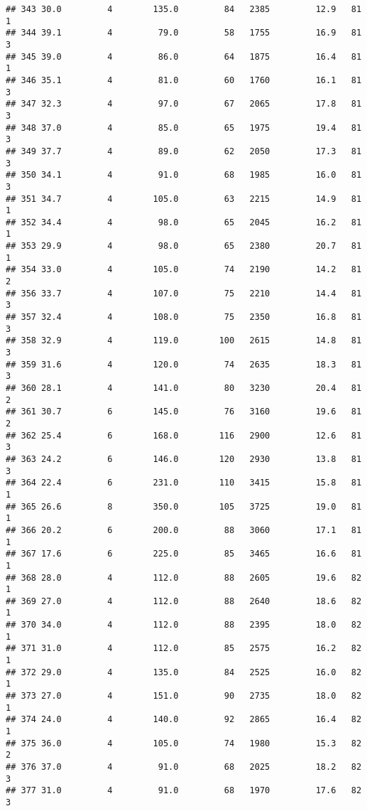 \documentclass[
]{article}
\begin{document}
\begin{verbatim}
## 343 30.0         4        135.0         84   2385         12.9   81      1
## 344 39.1         4         79.0         58   1755         16.9   81      3
## 345 39.0         4         86.0         64   1875         16.4   81      1
## 346 35.1         4         81.0         60   1760         16.1   81      3
## 347 32.3         4         97.0         67   2065         17.8   81      3
## 348 37.0         4         85.0         65   1975         19.4   81      3
## 349 37.7         4         89.0         62   2050         17.3   81      3
## 350 34.1         4         91.0         68   1985         16.0   81      3
## 351 34.7         4        105.0         63   2215         14.9   81      1
## 352 34.4         4         98.0         65   2045         16.2   81      1
## 353 29.9         4         98.0         65   2380         20.7   81      1
## 354 33.0         4        105.0         74   2190         14.2   81      2
## 356 33.7         4        107.0         75   2210         14.4   81      3
## 357 32.4         4        108.0         75   2350         16.8   81      3
## 358 32.9         4        119.0        100   2615         14.8   81      3
## 359 31.6         4        120.0         74   2635         18.3   81      3
## 360 28.1         4        141.0         80   3230         20.4   81      2
## 361 30.7         6        145.0         76   3160         19.6   81      2
## 362 25.4         6        168.0        116   2900         12.6   81      3
## 363 24.2         6        146.0        120   2930         13.8   81      3
## 364 22.4         6        231.0        110   3415         15.8   81      1
## 365 26.6         8        350.0        105   3725         19.0   81      1
## 366 20.2         6        200.0         88   3060         17.1   81      1
## 367 17.6         6        225.0         85   3465         16.6   81      1
## 368 28.0         4        112.0         88   2605         19.6   82      1
## 369 27.0         4        112.0         88   2640         18.6   82      1
## 370 34.0         4        112.0         88   2395         18.0   82      1
## 371 31.0         4        112.0         85   2575         16.2   82      1
## 372 29.0         4        135.0         84   2525         16.0   82      1
## 373 27.0         4        151.0         90   2735         18.0   82      1
## 374 24.0         4        140.0         92   2865         16.4   82      1
## 375 36.0         4        105.0         74   1980         15.3   82      2
## 376 37.0         4         91.0         68   2025         18.2   82      3
## 377 31.0         4         91.0         68   1970         17.6   82      3

\end{verbatim}
\end{document}
